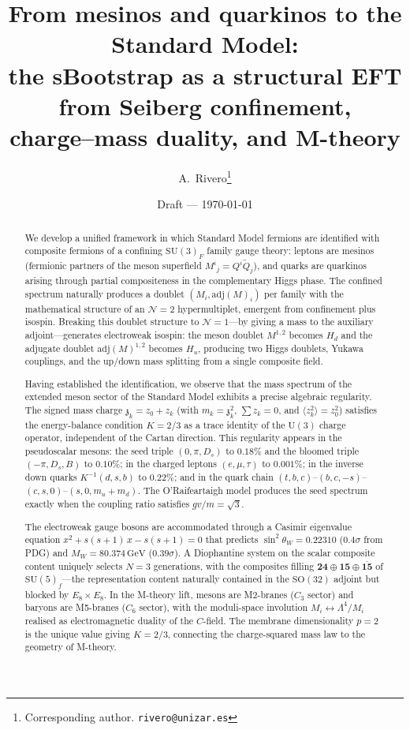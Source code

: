 \documentclass[12pt,a4paper]{article}
\title{From mesinos and quarkinos to the Standard Model:\\
  the sBootstrap as a structural EFT from Seiberg confinement,\\
  charge--mass duality, and M-theory}
\author{A.\ Rivero\thanks{Corresponding author. \texttt{rivero@unizar.es}}}
\date{Draft --- \today}
\newcommand{\SU}{\mathrm{SU}}
\newcommand{\UU}{\mathrm{U}}
\newcommand{\SO}{\mathrm{SO}}
\newcommand{\adj}{\mathrm{adj}}
\newcommand{\GeV}{\,\mathrm{GeV}}
\newcommand{\zch}{\mathfrak{z}}
\begin{document}
\maketitle

\begin{abstract}
We develop a unified framework in which Standard Model fermions
are identified with composite fermions of a confining
$\SU(3)_F$ family gauge theory: leptons are mesinos
(fermionic partners of the meson superfield $M^i{}_j = Q^i\tilde{Q}_j$),
and quarks are quarkinos arising through partial compositeness
in the complementary Higgs phase.
The confined spectrum naturally produces a doublet
$(M_i, \adj(M)_i)$ per family with the mathematical structure
of an $\mathcal{N}{=}2$ hypermultiplet, emergent from confinement
plus isospin.
Breaking this doublet structure to $\mathcal{N}{=}1$---by giving
a mass to the auxiliary adjoint---generates electroweak isospin:
the meson doublet $M^{1,2}$ becomes $H_d$ and the adjugate doublet
$\adj(M)^{1,2}$ becomes $H_u$, producing two Higgs doublets,
Yukawa couplings, and the up/down mass splitting from a single
composite field.

Having established the identification, we observe that the
mass spectrum of the extended meson sector of the Standard Model
exhibits a precise algebraic regularity.
The signed mass charge $\zch_k = z_0 + z_k$ (with
$m_k = \zch_k^2$, $\sum z_k = 0$, and $\langle z_k^2\rangle = z_0^2$)
satisfies the energy-balance condition $K = 2/3$ as a trace
identity of the $\UU(3)$ charge operator, independent of the
Cartan direction.
This regularity appears in the pseudoscalar mesons:
the seed triple $(0, \pi, D_s)$ to $0.18\%$ and the bloomed
triple $(-\pi, D_s, B)$ to $0.10\%$; in the charged leptons
$(e, \mu, \tau)$ to $0.001\%$; in the inverse down quarks
$K^{-1}(d,s,b)$ to $0.22\%$; and in the quark chain
$(t,b,c)$--$(b,c,-s)$--$(c,s,0)$--$(s,0,m_u{+}m_d)$.
The O'Raifeartaigh model produces the seed spectrum exactly
when the coupling ratio satisfies $gv/m = \sqrt{3}$.

The electroweak gauge bosons are accommodated through a
Casimir eigenvalue equation $x^2 + s(s{+}1)\,x - s(s{+}1) = 0$
that predicts $\sin^2\theta_W = 0.22310$ ($0.4\sigma$ from PDG)
and $M_W = 80.374\GeV$ ($0.39\sigma$).
A Diophantine system on the scalar composite content uniquely
selects $N = 3$ generations, with the composites filling
$\mathbf{24} \oplus \mathbf{15} \oplus \overline{\mathbf{15}}$
of $\SU(5)_f$---the representation content naturally contained
in the $\SO(32)$ adjoint but blocked by $E_8 \times E_8$.
In the M-theory lift, mesons are M2-branes ($C_3$ sector)
and baryons are M5-branes ($C_6$ sector), with the moduli-space
involution $M_i \leftrightarrow \Lambda^4/M_i$ realised as
electromagnetic duality of the $C$-field.
The membrane dimensionality $p = 2$ is the unique value giving
$K = 2/3$, connecting the charge-squared mass law to the
geometry of M-theory.
\end{abstract}
\end{document}
